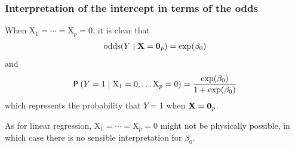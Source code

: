 \documentclass{beamer}
\begin{document}
\begin{frame}[fragile]
\frametitle{Interpretation of the intercept in terms of the odds}
\bi
\item When $\mathrm{X}_1=\cdots = \mathrm{X}_p=0$, it is clear that 
\begin{align*}
\mathrm{odds}(Y\mid \mathbf{X}=\bs{0}_p) = \exp(\beta_0)
\end{align*}
and 
\begin{align*}
\P{Y=1\mid \mathrm{X}_1=0, \ldots \mathrm{X}_p=0} = \frac{\exp({\beta_0})}{1+\exp({\beta_0})}
\end{align*}
which represents the probability that $Y=1$ when $\mathbf{X}=\bs{0}_p$.
\item As for linear regression, $\mathrm{X}_1=\cdots =\mathrm{X}_p=0$ might not be physically possible, in which case there is no sensible interpretation for $\beta_0$.
\ei
\end{frame}
\end{document}

